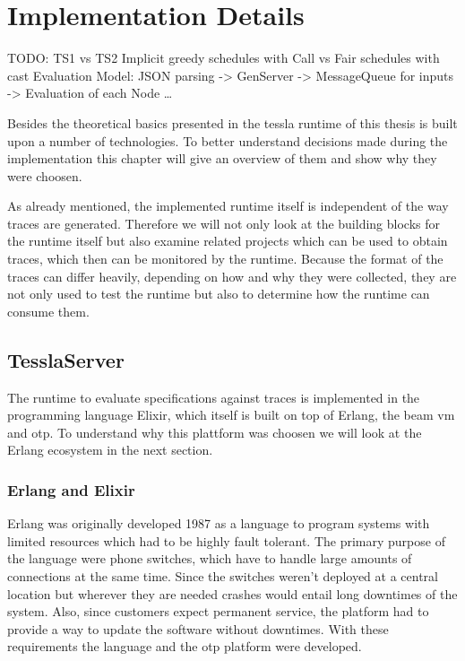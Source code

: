 %
\chapter{Implementation Details}
\label{sec:implementation}

TODO: TS1 vs TS2
      Implicit greedy schedules with Call vs Fair schedules with cast
      Evaluation Model: JSON parsing -> GenServer -> MessageQueue for inputs -> Evaluation of each Node \dots

Besides the theoretical basics presented in  the \gls{tessla} runtime of this thesis is built upon a number of technologies.
To better understand decisions made during the implementation this chapter will give an overview of them and show why they were choosen.

As already mentioned, the implemented runtime itself is independent of the way traces are generated.
Therefore we will not only look at the building blocks for the runtime itself but also examine related projects which can be used to obtain traces, which then can be monitored by the runtime.
Because the format of the traces can differ heavily, depending on how and why they were collected, they are not only used to test the runtime but also to determine how the runtime can consume them.

\section{TesslaServer}
\label{sec:implementation:tesslaserver}

The runtime to evaluate specifications against traces is implemented in the programming language Elixir, which itself is built on top of Erlang, the \gls{beam} \gls{vm} and \gls{otp}.
To understand why this plattform was choosen we will look at the Erlang ecosystem in the next section.

\subsection{Erlang and Elixir}
\label{sec:implementation:tesslaserver:erlang_elixir}

Erlang was originally developed 1987 as a language to program systems with limited resources which had to be highly fault tolerant.
The primary purpose of the language were phone switches, which have to handle large amounts of connections at the same time.
Since the switches weren't deployed at a central location but wherever they are needed crashes would entail long downtimes of the system.
Also, since customers expect permanent service, the platform had to provide a way to update the software without downtimes.
With these requirements the language and the \gls{otp} platform were developed.

